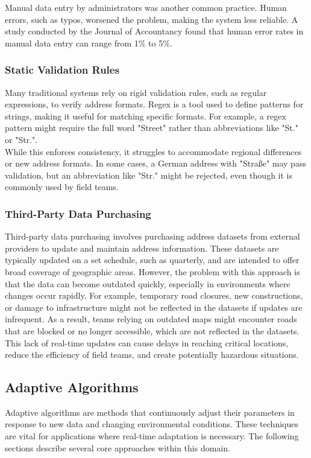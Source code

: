         Manual data entry by administrators was another common practice. Human errors, such as typos, worsened the problem, making the system less reliable. A study conducted by the Journal of Accountancy found that human error rates in manual data entry can range from 1\% to 5\%. \autocite{integrationmadeeasy2025Mar}

        \subsubsection{Static Validation Rules}
        Many traditional systems rely on rigid validation rules, such as regular expressions, to verify address formats. Regex is a tool used to define patterns for strings, making it useful for matching specific formats. For example, a regex pattern might require the full word "Street" rather than abbreviations like "St." or "Str.".\autocite{AutorenderWikimedia-Projekte2002Jul}\\
        
        While this enforces consistency, it struggles to accommodate regional differences or new address formats. In some cases, a German address with "Straße" may pass validation, but an abbreviation like "Str." might be rejected, even though it is commonly used by field teams.


        \subsubsection{Third-Party Data Purchasing}
        Third-party data purchasing involves purchasing address datasets from external providers to update and maintain address information. These datasets are typically updated on a set schedule, such as quarterly, and are intended to offer broad coverage of geographic areas. However, the problem with this approach is that the data can become outdated quickly, especially in environments where changes occur rapidly. For example, temporary road closures, new constructions, or damage to infrastructure might not be reflected in the datasets if updates are infrequent. As a result, teams relying on outdated maps might encounter roads that are blocked or no longer accessible, which are not reflected in the datasets. This lack of real-time updates can cause delays in reaching critical locations, reduce the efficiency of field teams, and create potentially hazardous situations.



    \subsection{Adaptive Algorithms}
    Adaptive algorithms are methods that continuously adjust their parameters in response to new data and changing environmental conditions. These techniques are vital for applications where real-time adaptation is necessary. The following sections describe several core approaches within this domain.


